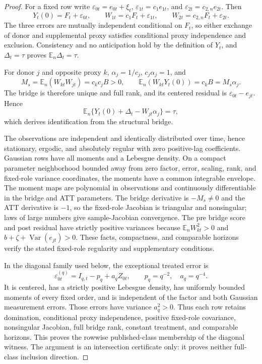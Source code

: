 \documentclass{article}
\begin{document}
\begin{proof}
For a fixed row write \(\varepsilon_{0t}=e_{0t}+\xi_t\), \(\varepsilon_{1t}=c_1e_{1t}\), and \(\varepsilon_{2t}=c_{2,n}e_{2t}\).  Then
\[
 Y_t(0)=F_t+\varepsilon_{0t},\qquad
 W_{1t}=c_1F_t+\varepsilon_{1t},\qquad
 W_{2t}=c_{2,n}F_t+\varepsilon_{2t}.
\]
The three errors are mutually independent conditional on \(F_t\), so either exchange of donor and supplemental proxy satisfies conditional proxy independence and exclusion.  Consistency and no anticipation hold by the definition of \(Y_t\), and \(\Delta_t=\tau\) proves \(\mathbb E_n\Delta_t=\tau\).

For donor \(j\) and opposite proxy \(k\), \(\alpha_j=1/c_j\), \(c_j\alpha_j=1\), and
\[
 M_s=\mathbb E_n(W_{kt}W_{jt})=c_kc_jB>0,
 \qquad
 \mathbb E_n(W_{kt}Y_t(0))=c_kB=M_s\alpha_j.
\]
The bridge is therefore unique and full rank, and its centered residual is \(\varepsilon_{0t}-e_{jt}\).  Hence
\[
 \mathbb E_n\{Y_t(0)+\Delta_t-W_{jt}\alpha_j\}=\tau,
\]
which derives identification from the structural bridge.

The observations are independent and identically distributed over time, hence stationary, ergodic, and absolutely regular with zero positive-lag coefficients.  Gaussian rows have all moments and a Lebesgue density.  On a compact parameter neighborhood bounded away from zero factor, error, scaling, rank, and fixed-role variance coordinates, the moments have a common integrable envelope.  The moment maps are polynomial in observations and continuously differentiable in the bridge and ATT parameters.  The bridge derivative is \(-M_s\ne0\) and the ATT derivative is \(-1\), so the fixed-role Jacobian is triangular and nonsingular; laws of large numbers give sample-Jacobian convergence.  The pre bridge score and post residual have strictly positive variances because \(\mathbb E_nW_{kt}^2>0\) and \(b+\zeta+\operatorname{Var}(e_{jt})>0\).  These facts, compactness, and comparable horizons verify the stated fixed-role regularity and supplementary conditions.

In the diagonal family used below, the exceptional treated error is
\[
 \varepsilon_{0t}^{(q)}=I_{q,t}-p_q+a_qZ_{0t},\qquad p_q=q^{-2},\quad a_q=q^{-4}.
\]
It is centered, has a strictly positive Lebesgue density, has uniformly bounded moments of every fixed order, and is independent of the factor and both Gaussian measurement errors.  Those errors have variance \(a_q^2>0\).  Thus each row retains domination, conditional proxy independence, positive fixed-role covariance, nonsingular Jacobian, full bridge rank, constant treatment, and comparable horizons.  This proves the rowwise published-class membership of the diagonal witness.  The argument is an intersection certificate only: it proves neither full-class inclusion direction.
\end{proof}
\end{document}
